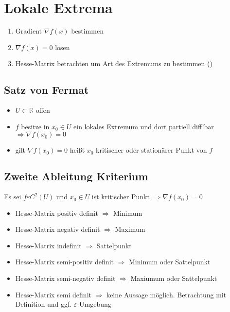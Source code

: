 \section{Lokale Extrema}

\begin{enumerate}
    \item Gradient $\nabla f(x)$ bestimmen
    \item $\nabla f(x) = 0$ lösen
    \item Hesse-Matrix betrachten um Art des Extremums zu bestimmen  ()
\end{enumerate}

\subsection{Satz von Fermat}
\begin{itemize}
    \item $U \subset \mathbb{R}$ offen
    \item $f$ besitze in $x_0 \in U $ ein lokales Extremum und dort partiell diff'bar \\
    $\Rightarrow \nabla f(x_0) = 0$ 
    \item gilt $\nabla f(x_0) = 0$ heißt $x_0$ kritischer oder stationärer Punkt von $f$ 
\end{itemize}

\subsection{Zweite Ableitung Kriterium}
\label{subsec:zweite-ableitung-krit-hessematrix}
Es sei $f \varepsilon C^2(U)$ und $x_0 \in U$ ist kritischer Punkt $\Rightarrow \nabla f(x_0) = 0$
\begin{itemize}
    \item Hesse-Matrix positiv definit $\Rightarrow$ Minimum
    \item Hesse-Matrix negativ definit $\Rightarrow$ Maximum
    \item Hesse-Matrix indefinit $\Rightarrow$ Sattelpunkt
    \item Hesse-Matrix semi-positiv definit $\Rightarrow$ Minimum oder Sattelpunkt
    \item Hesse-Matrix semi-negativ definit $\Rightarrow$ Maxiumum oder Sattelpunkt
    \item Hesse-Matrix semi definit $\Rightarrow$ keine Aussage möglich. Betrachtung mit Definition und ggf. $\varepsilon$-Umgebung
\end{itemize}

